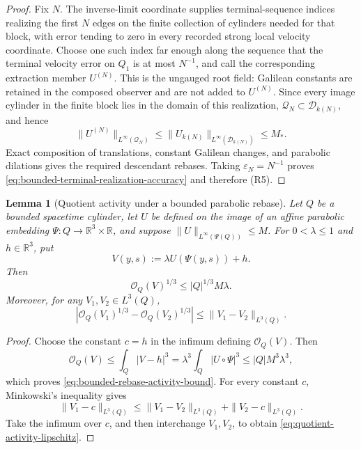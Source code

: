 \documentclass[11pt]{amsart}
\numberwithin{equation}{section}
\theoremstyle{plain}
\newtheorem{lemma}[lemma]{Lemma}
\theoremstyle{definition}
\theoremstyle{remark}
\begin{document}
\begin{proof}
Fix \(N\).  The inverse-limit coordinate supplies terminal-sequence indices
realizing the first \(N\) edges on the finite collection of cylinders needed
for that block, with error tending to zero in every recorded strong local
velocity coordinate.  Choose one such index far enough along the sequence
that the terminal velocity error on \(Q_1\) is at most \(N^{-1}\), and call
the corresponding extraction member \(U^{(N)}\).  This is the ungauged root
field: Galilean constants are retained in the composed observer and are not
added to \(U^{(N)}\).  Since every image cylinder in the finite block lies in
the domain of this realization,
\(\mathcal Q_N\subset\mathcal D_{k(N)}\), and hence
\[
 \|U^{(N)}\|_{L^\infty(\mathcal Q_N)}
 \le \|U_{k(N)}\|_{L^\infty(\mathcal D_{k(N)})}
 \le M_* .
\]
Exact composition of translations, constant Galilean changes, and parabolic
dilations gives the required descendant rebases.  Taking
\(\varepsilon_N=N^{-1}\) proves
\eqref{eq:bounded-terminal-realization-accuracy} and therefore \textup{(R5)}.
\end{proof}

\begin{lemma}[Quotient activity under a bounded parabolic rebase]
\label{lem:bounded-rebase-activity-decay}
Let \(Q\) be a bounded spacetime cylinder, let \(U\) be defined on the image
of an affine parabolic embedding \(\Psi:Q\to\mathbb R^3\times\mathbb R\), and
suppose \(\|U\|_{L^\infty(\Psi(Q))}\le M\).  For \(0<\lambda\le1\) and
\(h\in\mathbb R^3\), put
\begin{equation}\label{eq:bounded-parabolic-rebase}
 V(y,s):=\lambda U(\Psi(y,s))+h .
\end{equation}
Then
\begin{equation}\label{eq:bounded-rebase-activity-bound}
 \mathcal O_Q(V)^{1/3}
 \le |Q|^{1/3}M\lambda .
\end{equation}
Moreover, for any \(V_1,V_2\in L^3(Q)\),
\begin{equation}\label{eq:quotient-activity-lipschitz}
 \left|\mathcal O_Q(V_1)^{1/3}
       -\mathcal O_Q(V_2)^{1/3}\right|
 \le\|V_1-V_2\|_{L^3(Q)}.
\end{equation}
\end{lemma}

\begin{proof}
Choose the constant \(c=h\) in the infimum defining \(\mathcal O_Q(V)\).
Then
\[
 \mathcal O_Q(V)
 \le\int_Q|V-h|^3
 =\lambda^3\int_Q|U\circ\Psi|^3
 \le |Q|M^3\lambda^3,
\]
which proves \eqref{eq:bounded-rebase-activity-bound}.  For every constant
\(c\), Minkowski's inequality gives
\[
 \|V_1-c\|_{L^3(Q)}
 \le\|V_1-V_2\|_{L^3(Q)}+\|V_2-c\|_{L^3(Q)}.
\]
Take the infimum over \(c\), and then interchange \(V_1,V_2\), to obtain
\eqref{eq:quotient-activity-lipschitz}.
\end{proof}
\end{document}
